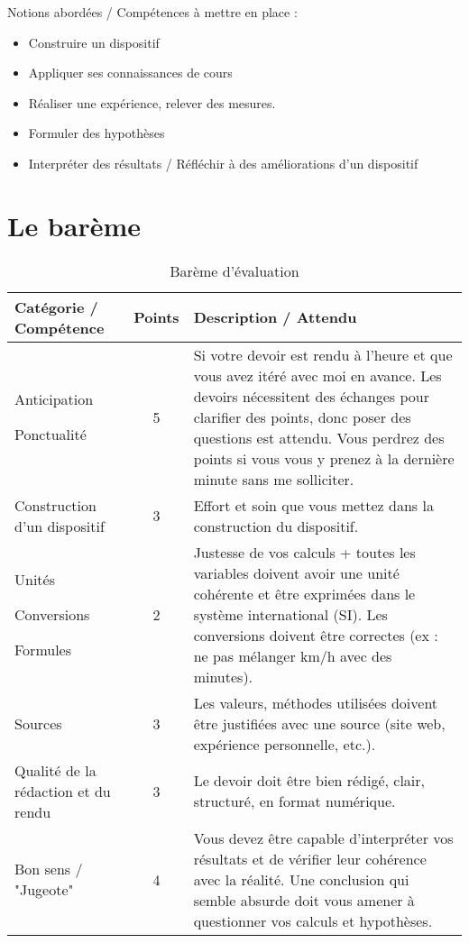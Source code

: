 \documentclass[a4paper,12pt]{article}
\begin{document}
\vspace{1em}
Notions abordées / Compétences à mettre en place :
\begin{itemize}[noitemsep]
  \item Construire un dispositif
  \item Appliquer ses connaissances de cours
  \item Réaliser une expérience, relever des mesures. 
  \item Formuler des hypothèses
  \item Interpréter des résultats / Réfléchir à des améliorations d'un dispositif
\end{itemize}

\section*{Le barème}

\begin{table}[H]
  \centering
  \renewcommand{\arraystretch}{1.3} %
  \begin{tabular}{|m{5cm}|c|m{9cm}|}
      \hline
      \textbf{Catégorie / Compétence} & \textbf{Points} & \textbf{Description / Attendu} \\
      \hline
      Anticipation \par Ponctualité & 5 & Si votre devoir est rendu à l'heure et que vous avez itéré avec moi en avance. Les devoirs nécessitent des échanges pour clarifier des points, donc poser des questions est attendu. Vous perdrez des points si vous vous y prenez à la dernière minute sans me solliciter. \\
      \hline
      Construction d'un dispositif & 3 & Effort et soin que vous mettez dans la construction du dispositif. \\
      \hline
      Unités \par Conversions \par Formules & 2 & Justesse de vos calculs + toutes les variables doivent avoir une unité cohérente et être exprimées dans le système international (SI). Les conversions doivent être correctes (ex : ne pas mélanger km/h avec des minutes). \\
      \hline
      Sources & 3 & Les valeurs, méthodes utilisées doivent être justifiées avec une source (site web, expérience personnelle, etc.). \\
      \hline
      Qualité de la rédaction et du rendu & 3 & Le devoir doit être bien rédigé, clair, structuré, en format numérique. \\
      \hline
      Bon sens / "Jugeote" & 4 & Vous devez être capable d'interpréter vos résultats et de vérifier leur cohérence avec la réalité. Une conclusion qui semble absurde doit vous amener à questionner vos calculs et hypothèses. \\
      \hline
  \end{tabular}
  \caption{Barème d'évaluation}
  \label{tab:bareme}
\end{table}
\end{document}
